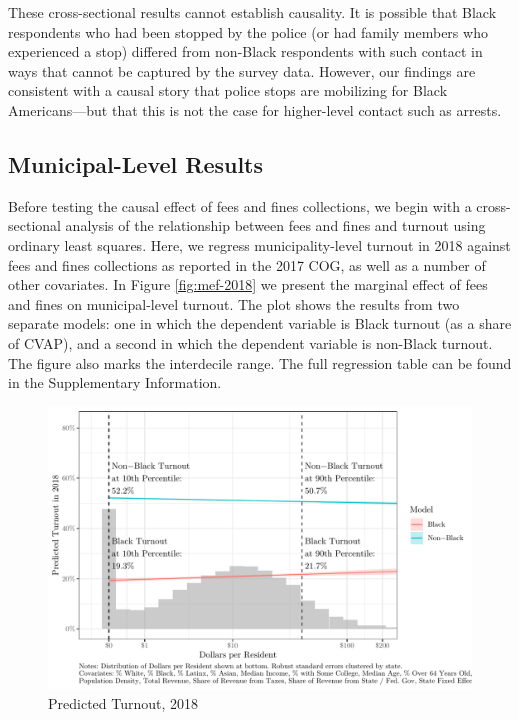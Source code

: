 \documentclass[
  12pt,
]{article}
\begin{document}
These cross-sectional results cannot establish causality. It is possible that Black respondents who had been stopped by the police (or had family members who experienced a stop) differed from non-Black respondents with such contact in ways that cannot be captured by the survey data. However, our findings are consistent with a causal story that police stops are mobilizing for Black Americans---but that this is not the case for higher-level contact such as arrests.

\hypertarget{municipal-level-results}{%
\subsection*{Municipal-Level Results}\label{municipal-level-results}}

Before testing the causal effect of fees and fines collections, we begin with a cross-sectional analysis of the relationship between fees and fines and turnout using ordinary least squares. Here, we regress municipality-level turnout in 2018 against fees and fines collections as reported in the 2017 COG, as well as a number of other covariates. In Figure \ref{fig:mef-2018} we present the marginal effect of fees and fines on municipal-level turnout. The plot shows the results from two separate models: one in which the dependent variable is Black turnout (as a share of CVAP), and a second in which the dependent variable is non-Black turnout. The figure also marks the interdecile range. The full regression table can be found in the Supplementary Information.

\begin{figure}[H]

{\centering \includegraphics{draft_paper_files/figure-latex/cross-18-1} 

}

\caption{\label{fig:mef-2018}Predicted Turnout, 2018}\label{fig:cross-18}
\end{figure}
\end{document}
